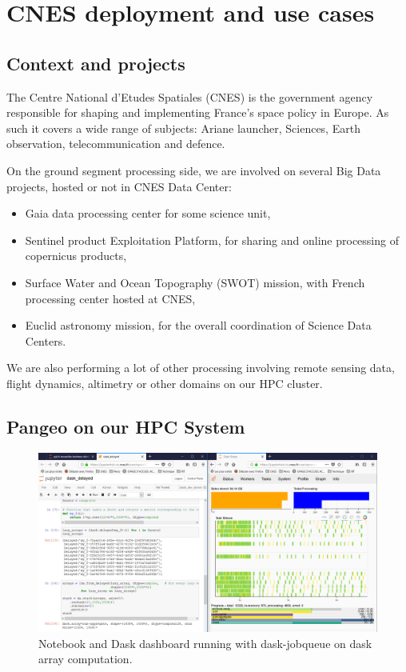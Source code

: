 \documentclass{article}
\begin{document}
\section{CNES deployment and use cases}
\label{sec:cnes}

\subsection{Context and projects}
\label{ssec:context}

The Centre National d'Etudes Spatiales (CNES) is the government agency responsible for shaping and implementing France's space policy in Europe. As such it covers a wide range of subjects: Ariane launcher, Sciences, Earth observation, telecommunication and defence.

On the ground segment processing side, we are involved on several Big Data projects, hosted or not in CNES Data Center:
\begin{itemize}
\item Gaia data processing center for some science unit,
\item Sentinel product Exploitation Platform, for sharing and online processing of copernicus products,
\item Surface Water and Ocean Topography (SWOT) mission, with French processing center hosted at CNES,
\item Euclid astronomy mission, for the overall coordination of Science Data Centers.
\end{itemize}

We are also performing a lot of other processing involving remote sensing data, flight dynamics, altimetry or other domains on our HPC cluster.

\subsection{Pangeo on our HPC System}
\label{ssec:pangeohpc}

\begin{figure}
  \centering
  \includegraphics[width=\columnwidth]{dask_jobqueue.png}
  \caption{\label{dask_jobqueue} Notebook and Dask dashboard running with dask-jobqueue on dask array computation.}
\end{figure}
\end{document}
